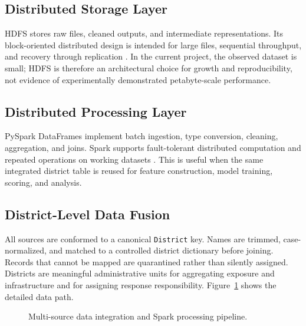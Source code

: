 \documentclass[conference]{IEEEtran}
\begin{document}
\subsection{Distributed Storage Layer}
HDFS stores raw files, cleaned outputs, and intermediate representations. Its
block-oriented distributed design is intended for large files, sequential
throughput, and recovery through replication \cite{hdfs}. In the current
project, the observed dataset is small; HDFS is therefore an architectural
choice for growth and reproducibility, not evidence of experimentally
demonstrated petabyte-scale performance.

\subsection{Distributed Processing Layer}
PySpark DataFrames implement batch ingestion, type conversion, cleaning,
aggregation, and joins. Spark supports fault-tolerant distributed computation
and repeated operations on working datasets \cite{spark}. This is useful when
the same integrated district table is reused for feature construction, model
training, scoring, and analysis.

\subsection{District-Level Data Fusion}
All sources are conformed to a canonical \texttt{District} key. Names are
trimmed, case-normalized, and matched to a controlled district dictionary before
joining. Records that cannot be mapped are quarantined rather than silently
assigned. Districts are meaningful administrative units for aggregating
exposure and infrastructure and for assigning response responsibility.
Figure~\ref{fig:pipeline} shows the detailed data path.

\begin{figure}[t]
\centering
{}
\caption{Multi-source data integration and Spark processing pipeline.}
\label{fig:pipeline}
\end{figure}
\end{document}
